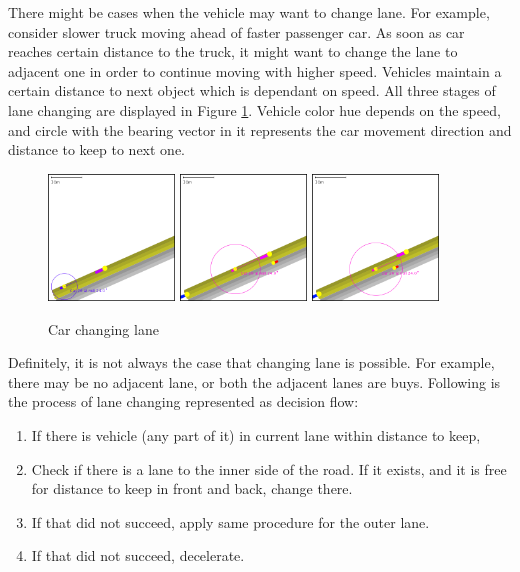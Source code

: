 There might be cases when the vehicle may want to change lane. For example, consider slower truck moving ahead of faster passenger car. As soon as car reaches certain distance to the truck, it might want to change the lane to adjacent one in order to continue moving with higher speed. Vehicles maintain a certain distance to next object which is dependant on speed. All three stages of lane changing are displayed in Figure \ref{fig:carKeepingDistance}. Vehicle color hue depends on the speed, and circle with the bearing vector in it represents the car movement direction and distance to keep to next one.
\begin{figure}[!h]
    \caption{Car changing lane}
    \label{fig:carKeepingDistance}
    \centering
    \includegraphics[width=0.3\textwidth]{figs/carMovement/car_keeping_distance_to_other.png}
    \hspace{0.2em}
    \includegraphics[width=0.3\textwidth]{figs/carMovement/car_lane_change_before.png}
    \hspace{0.2em}
    \includegraphics[width=0.3\textwidth]{figs/carMovement/car_lane_change_after.png}
\end{figure}

Definitely, it is not always the case that changing lane is possible. For example, there may be no adjacent lane, or both the adjacent lanes are buys. Following is the process of lane changing represented as decision flow:
\begin{enumerate}
    \item If there is vehicle (any part of it) in current lane within distance to keep,
    \item Check if there is a lane to the inner side of the road. If it exists, and it is free for distance to keep in front and back, change there.
    \item If that did not succeed, apply same procedure for the outer lane.
    \item If that did not succeed, decelerate.
\end{enumerate}

